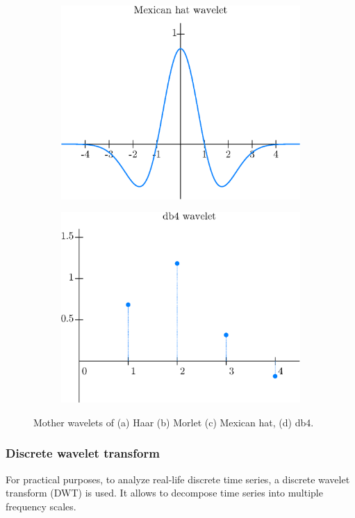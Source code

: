 \begin{figure}[h]
\begin{subfigure}{\minipagewidth}
		\centering
		\includegraphics[width=\textwidth]{figures/mexican.eps}
		\caption{}
	\end{subfigure}
	\begin{subfigure}{\minipagewidth}
		\centering
		\includegraphics[width=\textwidth]{figures/db4.eps}
		\caption{}
	\end{subfigure}
    \caption{Mother wavelets of (a) Haar (b) Morlet (c) Mexican hat, (d) db4.}
	\label{fig:wavelets}
\end{figure}

\subsubsection{Discrete wavelet transform}
For practical purposes, to analyze real-life discrete time series, a discrete wavelet transform (DWT) is used.
It allows to decompose time series into multiple frequency scales.

